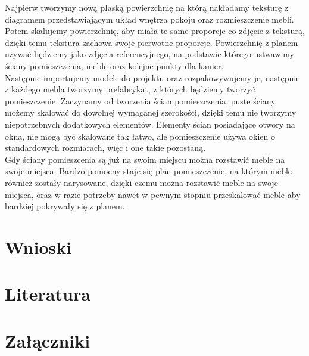 \documentclass{article} %
\begin{document}
            Najpierw tworzymy nową płaską powierzchnię na którą nakładamy teksturę z diagramem przedstawiającym układ wnętrza pokoju oraz rozmieszczenie mebli. Potem skalujemy powierzchnię, aby miała te same proporcje co zdjęcie z teksturą, dzięki temu tekstura zachowa swoje pierwotne proporcje. Powierzchnię z planem używać będziemy jako zdjęcia referencyjnego, na podstawie którego ustwawimy ściany pomieszczenia, meble oraz kolejne punkty dla kamer.
            \\
            
            Następnie importujemy modele do projektu oraz rozpakowywujemy je, następnie z każdego mebla tworzymy prefabrykat, z których będziemy tworzyć pomieszczenie. Zaczynamy od tworzenia ścian pomieszczenia, puste ściany możemy skalować do dowolnej wymaganej szerokości, dzięki temu nie tworzymy niepotrzebnych dodatkowych elementów. Elementy ścian posiadające otwory na okna, nie mogą być skalowane tak łatwo, ale pomieszczenie używa okien o standardowych rozmiarach, więc i one takie pozostaną.
            \\
            
            Gdy ściany pomieszcenia są już na swoim miejscu można rozstawić meble na swoje miejsca. Bardzo pomocny staje się plan pomieszczenie, na którym meble również zostały narysowane, dzięki czemu można rozstawić meble na swoje miejsca, oraz w razie potrzeby nawet w pewnym stopniu przeskalować meble aby bardziej pokrywały się z planem.
            \\
        

\section{Wnioski}


\newpage
\section{Literatura}

\newpage
\section{Załączniki}
\end{document}
